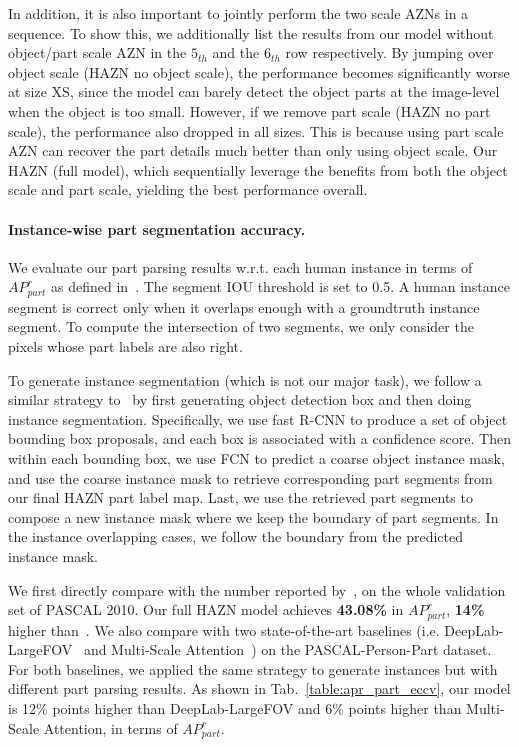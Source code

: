 In addition, it is also important to jointly perform the two scale AZNs in a sequence. To show this, we additionally list the results from our model without object/part scale AZN in the $5_{th}$ and the $6_{th}$ row respectively. 
By jumping over object scale (HAZN no object scale), the performance becomes significantly worse at size XS,
since the model can barely detect the object parts at the image-level when the object is too small.  However, if we remove part scale (HAZN no part scale),
the performance also dropped in all sizes. This is because using part scale AZN can recover the part details much better than only using object scale.
Our HAZN (full model), which sequentially leverage the benefits from both the object scale and part scale, yielding the best performance overall.

\paragraph{\textbf{Instance-wise part segmentation accuracy.}} 
We evaluate our part parsing results w.r.t. each human instance in terms of $AP^r_{part}$ as defined in~\cite{hariharan2015hypercolumns}. The segment IOU threshold is set to 0.5. A human instance segment is correct only when it overlaps enough with a groundtruth instance segment. To compute the intersection of two segments, we only consider the pixels whose part labels are also right.

To generate instance segmentation (which is not our major task), we follow a similar strategy to~\cite{hariharan2015hypercolumns} by first generating object detection box and then doing instance segmentation. Specifically, we use fast R-CNN to produce a set of object bounding box proposals, and each box is associated with a confidence score. Then within each bounding box, we use FCN to predict a coarse object instance mask, and use the coarse instance mask to retrieve corresponding part segments from our final HAZN part label map. Last, we use the retrieved part segments to compose a new instance mask where we keep the boundary of part segments. In the instance overlapping cases, we follow the boundary from the predicted instance mask.

We first directly compare with the number reported by~\cite{hariharan2015hypercolumns}, on the whole validation set of PASCAL 2010. Our full HAZN model achieves \textbf{43.08\%} in $AP^r_{part}$, \textbf{14\%} higher than~\cite{hariharan2015hypercolumns}. We also compare with two state-of-the-art baselines (i.e. DeepLab-LargeFOV~\cite{chen2016deeplab} and Multi-Scale Attention~\cite{chen2016attention}) on the PASCAL-Person-Part dataset. For both baselines, we applied the same strategy to generate instances but with different part parsing results. As shown in Tab.~\ref{table:apr_part_eccv}, our model is 12\% points higher than DeepLab-LargeFOV and 6\% points higher than Multi-Scale Attention, in terms of $AP^r_{part}$. 

